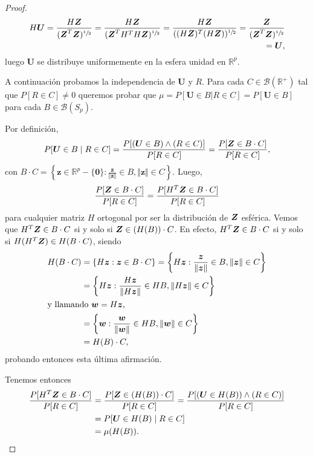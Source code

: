 \begin{proof}
  \begin{align*}
    H\boldsymbol U = \frac{H\boldsymbol{Z}}{(\boldsymbol{Z}^T\boldsymbol{Z})^{\sfrac{1}{2}}}
      = \frac{H\boldsymbol{Z}}{(\boldsymbol{Z}^TH^TH\boldsymbol{Z})^{\sfrac{1}{2}}}
      = \frac{H\boldsymbol{Z}}{((H\boldsymbol{Z})^T(H\boldsymbol{Z}))^{\sfrac{1}{2}}}
      = \frac{\boldsymbol{Z}}{(\boldsymbol{Z}^T\boldsymbol{Z})^{\sfrac{1}{2}}}\\
      = \boldsymbol U,
  \end{align*} luego $\boldsymbol U$ se distribuye uniformemente en la esfera unidad en $\mathbb R^p$.

  A continuación probamos la independencia de $\boldsymbol U$ y $R$. Para cada $C \in \mathcal B(\mathbb R^+)$ tal que $P[R \in C] \neq 0$ queremos probar que $\mu = P[\boldsymbol U \in B | R \in C] = P[\boldsymbol U \in B]$ para cada $B \in \mathcal B(S_p)$.

  Por definición, \begin{align*}
    P[\boldsymbol U \in B \mid R \in C] = \frac{P[(\boldsymbol U \in B) \land (R \in C)]}{P[R \in C]} = \frac{P[\boldsymbol{Z} \in B \cdot C]}{P[R \in C]},
  \end{align*} con $B \cdot C = \left\{\boldsymbol z \in \mathbb R^p - \{\boldsymbol 0\} : \frac{\boldsymbol z}{\Vert \boldsymbol z \Vert} \in B, \Vert \boldsymbol z \Vert \in C\right\}$. Luego, \begin{align*}
    \frac{P[\boldsymbol{Z} \in B \cdot C]}{P[R \in C]} = \frac{P[H^T\boldsymbol{Z} \in B \cdot C]}{P[R \in C]}
  \end{align*} para cualquier matriz $H$ ortogonal por ser la distribución de $\boldsymbol{Z}$ esférica. Vemos que $H^T\boldsymbol{Z} \in B \cdot C$ si y solo si $\boldsymbol{Z} \in (H(B)) \cdot C$. En efecto, $H^T\boldsymbol{Z} \in B \cdot C$ si y solo si $H(H^T\boldsymbol{Z}) \in H(B \cdot C)$, siendo \begin{align*}
    H(B\cdot C) &= \left\{H \boldsymbol z : \boldsymbol z \in B \cdot C\right\} = \left\{H \boldsymbol z : \frac{\boldsymbol z}{\Vert \boldsymbol z \Vert} \in B, \Vert \boldsymbol z \Vert \in C\right\} \\
      &= \left\{H \boldsymbol z : \frac{H \boldsymbol z}{\Vert H \boldsymbol z\Vert} \in HB, \Vert H\boldsymbol z\Vert \in C\right\}\\
      \shortintertext{y llamando $\boldsymbol w = H\boldsymbol z$,}
      &= \left\{\boldsymbol w : \frac{\boldsymbol w}{\Vert \boldsymbol w\Vert} \in HB, \Vert \boldsymbol w\Vert \in C\right\}\\
      &= H(B) \cdot C,
  \end{align*} probando entonces esta última afirmación.

  Tenemos entonces \begin{align*}
    \frac{P[H^T\boldsymbol{Z} \in B \cdot C]}{P[R \in C]} &= \frac{P[\boldsymbol{Z} \in (H(B)) \cdot C]}{P[R \in C]}
       = \frac{P[(\boldsymbol U \in H(B)) \land (R \in C)]}{P[R \in C]} \\
      &= P[\boldsymbol U \in H(B) \mid R \in C] \\
      &= \mu(H(B)).
  \end{align*}
\end{proof}


